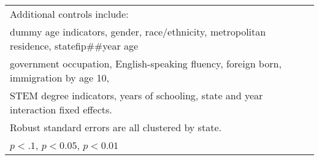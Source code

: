 \begin{table}[htbp]
\begin{tabular}{l*{3}{c}}
\multicolumn{4}{l}{\footnotesize Additional controls include:}\\
\multicolumn{4}{l}{\footnotesize dummy age indicators, gender, race/ethnicity, metropolitan residence, statefip##year age}\\
\multicolumn{4}{l}{\footnotesize government occupation, English-speaking fluency, foreign born, immigration by age 10,}\\
\multicolumn{4}{l}{\footnotesize STEM degree indicators, years of schooling, state and year interaction fixed effects.}\\
\multicolumn{4}{l}{\footnotesize Robust standard errors are all clustered by state.}\\
\multicolumn{4}{l}{\footnotesize \sym{*} \(p<.1\), \sym{**} \(p<0.05\), \sym{***} \(p<0.01\)}\\
\end{tabular}
\end{table}
